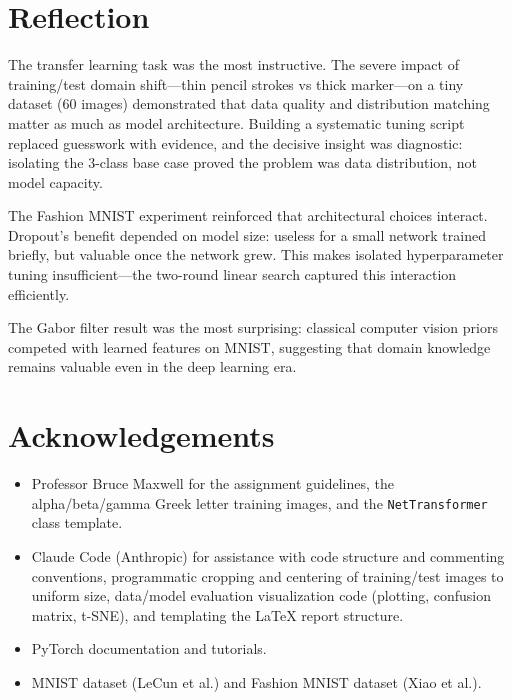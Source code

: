 \documentclass[11pt]{article}
\begin{document}
\section{Reflection}

The transfer learning task was the most instructive. The severe impact
of training/test domain shift---thin pencil strokes vs thick marker---on
a tiny dataset (60 images) demonstrated that data quality and
distribution matching matter as much as model architecture. Building a
systematic tuning script replaced guesswork with evidence, and the
decisive insight was diagnostic: isolating the 3-class base case proved
the problem was data distribution, not model capacity.

The Fashion MNIST experiment reinforced that architectural choices
interact. Dropout's benefit depended on model size: useless for a small
network trained briefly, but valuable once the network grew. This makes
isolated hyperparameter tuning insufficient---the two-round linear
search captured this interaction efficiently.

The Gabor filter result was the most surprising: classical computer
vision priors competed with learned features on MNIST, suggesting that
domain knowledge remains valuable even in the deep learning era.

\section{Acknowledgements}

\begin{itemize}
    \item Professor Bruce Maxwell for the assignment guidelines,
    the alpha/beta/gamma Greek letter training images, and the
    \texttt{NetTransformer} class template.
    \item Claude Code (Anthropic) for assistance with code structure
    and commenting conventions, programmatic cropping and centering
    of training/test images to uniform size, data/model evaluation
    visualization code (plotting, confusion matrix, t-SNE), and
    templating the \LaTeX{} report structure.
    \item PyTorch documentation and tutorials.
    \item MNIST dataset (LeCun et al.) and Fashion MNIST dataset
    (Xiao et al.).
\end{itemize}
\end{document}

